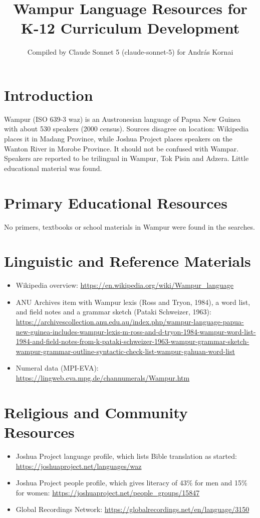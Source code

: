 \documentclass[12pt]{article}
\title{Wampur Language Resources for K-12 Curriculum Development}
\author{Compiled by Claude Sonnet 5 (claude-sonnet-5) for Andr\'as Kornai}
\date{}
\begin{document}
\maketitle
\section{Introduction}
Wampur (ISO 639-3 waz) is an Austronesian language of Papua New Guinea with about 530 speakers (2000 census). Sources disagree on location: Wikipedia places it in Madang Province, while Joshua Project places speakers on the Wanton River in Morobe Province. It should not be confused with Wampar. Speakers are reported to be trilingual in Wampur, Tok Pisin and Adzera. Little educational material was found.
\section{Primary Educational Resources}
No primers, textbooks or school materials in Wampur were found in the searches.
\section{Linguistic and Reference Materials}
\begin{itemize}
\item Wikipedia overview: \url{https://en.wikipedia.org/wiki/Wampur_language}
\item ANU Archives item with Wampur lexis (Ross and Tryon, 1984), a word list, and field notes and a grammar sketch (Pataki Schweizer, 1963): \url{https://archivescollection.anu.edu.au/index.php/wampur-language-papua-new-guinea-includes-wampur-lexis-m-ross-and-d-tryon-1984-wampur-word-list-1984-and-field-notes-from-k-pataki-schweizer-1963-wampur-grammar-sketch-wampur-grammar-outline-syntactic-check-list-wampur-gahuan-word-list}
\item Numeral data (MPI-EVA): \url{https://lingweb.eva.mpg.de/channumerals/Wampur.htm}
\end{itemize}
\section{Religious and Community Resources}
\begin{itemize}
\item Joshua Project language profile, which lists Bible translation as started: \url{https://joshuaproject.net/languages/waz}
\item Joshua Project people profile, which gives literacy of 43\% for men and 15\% for women: \url{https://joshuaproject.net/people_groups/15847}
\item Global Recordings Network: \url{https://globalrecordings.net/en/language/3150}
\end{itemize}
\end{document}
